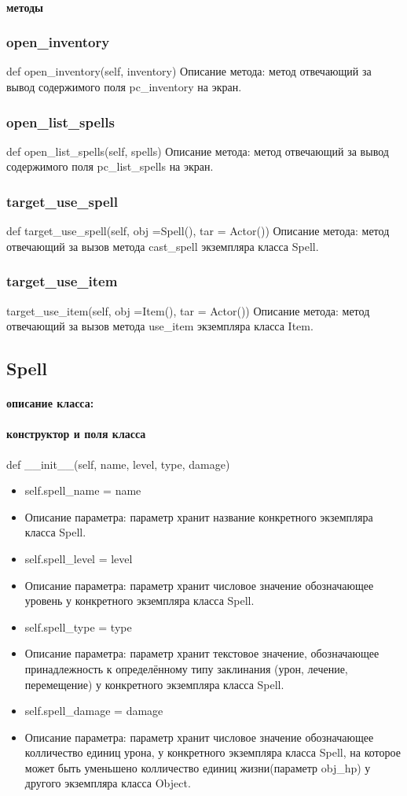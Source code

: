 \paragraph{методы}
\subsubsection{open\_inventory}
def open\_inventory(self, inventory)
Описание метода:  метод отвечающий за вывод содержимого поля pc\_inventory на экран.
\subsubsection{open\_list\_spells}
def open\_list\_spells(self, spells)
Описание метода: метод отвечающий за вывод содержимого поля pc\_list\_spells на экран.
\subsubsection{target\_use\_spell}
def target\_use\_spell(self, obj =Spell(), tar = Actor())
Описание метода: метод отвечающий за вызов метода cast\_spell экземпляра класса Spell.
\subsubsection{target\_use\_item}
target\_use\_item(self, obj =Item(), tar = Actor())
Описание метода: метод отвечающий за вызов метода use\_item экземпляра класса Item.

\subsection{Spell}
\paragraph{описание класса:}
\paragraph{конструктор и поля класса}
def \_\_init\_\_(self, name, level, type, damage)
\begin{itemize}
	\item self.spell\_name = name
	\item Описание параметра: параметр хранит название конкретного экземпляра класса Spell.
	\item self.spell\_level = level
	\item Описание параметра: параметр хранит числовое значение обозначающее уровень у конкретного экземпляра класса Spell.
	\item self.spell\_type = type
	\item Описание параметра: параметр хранит текстовое значение, обозначающее принадлежность к определённому типу заклинания (урон, лечение, перемещение) у конкретного экземпляра класса Spell.
	\item self.spell\_damage = damage
	\item Описание параметра: параметр хранит числовое значение обозначающее колличество единиц урона, у конкретного экземпляра класса Spell, на которое может быть уменьшено колличество единиц жизни(параметр obj\_hp) у другого экземпляра класса Object.

\end{itemize}
